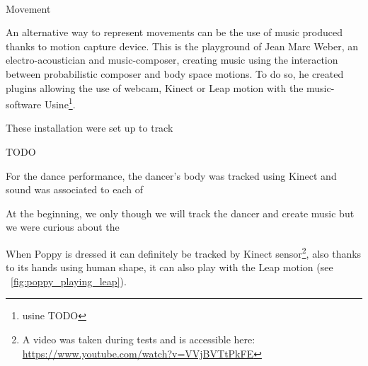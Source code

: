 \begin{NFfigure}
\centering
    \hfil
    \\
    \hfil
    \caption{Movement }
    \label{fig:residency_canvas}
\end{NFfigure}


An alternative way to represent movements can be the use of music produced thanks to motion capture device. This is the playground of Jean Marc Weber, an electro-acoustician and music-composer, creating music using the interaction between probabilistic composer and body space motions. To do so, he created plugins allowing the use of webcam, Kinect or Leap motion with the music-software Usine\footnote{usine TODO}.

These installation were set up to track

TODO

For the dance performance, the dancer's body was tracked using Kinect and sound was associated to each of

At the beginning, we only though we will track the dancer and create music but we were curious about the

When Poppy is dressed it can definitely be tracked by Kinect sensor\footnote{A video was taken during tests and is accessible here: \url{https://www.youtube.com/watch?v=VVjBVTtPkFE}}, also thanks to its hands using human shape, it can also play with the Leap motion (see \figurename~\ref{fig:poppy_playing_leap}).

\begin{NFfigure}
\centering
    \hfil
    \caption{}
    \label{fig:}
\end{NFfigure}

